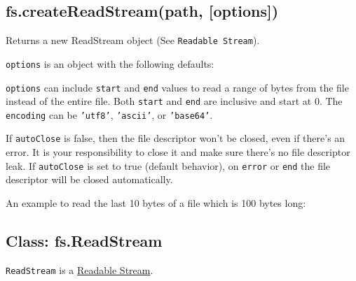 \subsection{fs.createReadStream(path, {[}options{]})}

Returns a new ReadStream object (See \texttt{Readable Stream}).

\texttt{options} is an object with the following defaults:

\begin{Shaded}
\begin{Highlighting}[]
\NormalTok{\{ }\NormalTok{: }\NormalTok{,}
  \NormalTok{: }\NormalTok{,}
  \NormalTok{: }
\NormalTok{\}}
\end{Highlighting}
\end{Shaded}

\texttt{options} can include \texttt{start} and \texttt{end} values to
read a range of bytes from the file instead of the entire file. Both
\texttt{start} and \texttt{end} are inclusive and start at 0. The
\texttt{encoding} can be \texttt{'utf8'}, \texttt{'ascii'}, or
\texttt{'base64'}.

If \texttt{autoClose} is false, then the file descriptor won't be
closed, even if there's an error. It is your responsibility to close it
and make sure there's no file descriptor leak. If \texttt{autoClose} is
set to true (default behavior), on \texttt{error} or \texttt{end} the
file descriptor will be closed automatically.

An example to read the last 10 bytes of a file which is 100 bytes long:

\begin{Shaded}
\begin{Highlighting}[]
\NormalTok{(}\NormalTok{, \{}\NormalTok{: }\NormalTok{, }\NormalTok{: }\NormalTok{\});}
\end{Highlighting}
\end{Shaded}

\subsection{Class: fs.ReadStream}

\texttt{ReadStream} is a
\href{stream.html\#stream\_class\_stream\_readable}{Readable Stream}.

